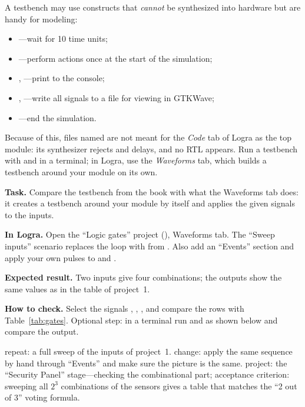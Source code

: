 A testbench may use constructs that \emph{cannot} be synthesized into
hardware but are handy for modeling:
\begin{itemize}
  \item {}---wait for 10 time units;
  \item {}---perform actions once at the start
        of the simulation;
  \item {}, ---print to the console;
  \item {}, ---write all signals to a
         file for viewing in GTKWave;
  \item {}---end the simulation.
\end{itemize}

Because of this, files named  are not meant for the \emph{Code}
tab of Logra as the top module: its synthesizer rejects  and
delays, and no RTL appears. Run a testbench with  and
 in a terminal; in Logra, use the \emph{Waveforms} tab, which builds
a testbench around your module on its own.

\begin{diybox}
\textbf{Task.} Compare the testbench from the book with what the Waveforms tab does: it creates a testbench around your module by itself and applies the given signals to the inputs.

\textbf{In Logra.} Open the ``Logic gates'' project (), Waveforms tab. The ``Sweep inputs'' scenario replaces the loop with  from . Also add an ``Events'' section and apply your own pulses to  and .

\textbf{Expected result.} Two inputs give four combinations; the outputs show the same values as in the table of project~1.

\textbf{How to check.} Select the signals , , , and compare the rows with Table~\ref{tab:gates}. Optional step: in a terminal run  and  as shown below and compare the output.

 repeat: a full sweep of the inputs of project~1.  change: apply the same sequence by hand through ``Events'' and make sure the picture is the same.  project: the ``Security Panel'' stage---checking the combinational part; acceptance criterion: sweeping all $2^3$ combinations of the sensors gives a table that matches the ``2 out of 3'' voting formula.
\end{diybox}

